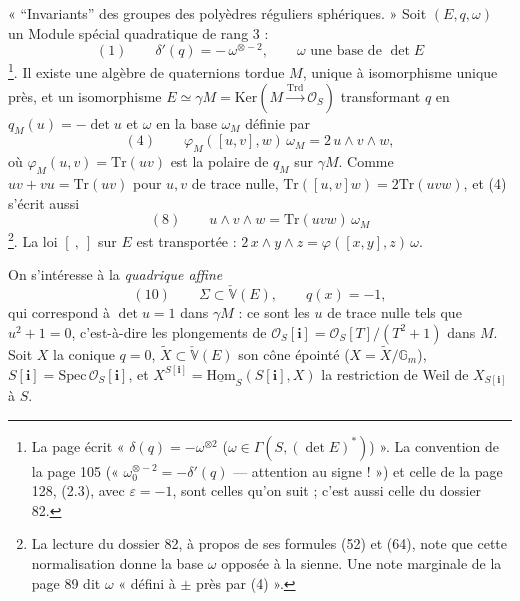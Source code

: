 \documentclass[11pt,a4paper]{article}
\begin{document}
« “Invariants” des groupes des polyèdres réguliers sphériques. » Soit $(E, q,
\omega)$ un Module spécial quadratique de rang $3$ :
\[
  (1) \qquad \delta'(q) = -\,\omega^{\otimes -2}, \qquad \omega \text{ une base de }
  \det E
\]
\footnote{La page écrit « $\delta(q) = -\omega^{\otimes 2}$ ($\omega \in \Gamma(S, (\det
E)^{*})$) ». La convention de la page 105 (« $\omega_0^{\otimes -2} =
-\delta'(q)$ — attention au signe ! ») et celle de la page 128, (2.3), avec $\varepsilon
= -1$, sont celles qu'on suit ; c'est aussi celle du dossier 82.}. Il existe une
algèbre de quaternions tordue $M$, unique à isomorphisme unique près, et un
isomorphisme $E \simeq \gamma M = \mathrm{Ker}(M \xrightarrow{\mathrm{Trd}} \mathcal{O}_S)$
transformant $q$ en $q_M(u) = -\det u$ et $\omega$ en la base $\omega_M$ définie par
\[
  (4) \qquad \varphi_M([u, v], w)\, \omega_M = 2\, u \wedge v \wedge w ,
\]
où $\varphi_M(u, v) = \mathrm{Tr}(uv)$ est la polaire de $q_M$ sur $\gamma M$. Comme
$uv + vu = \mathrm{Tr}(uv)$ pour $u, v$ de trace nulle, $\mathrm{Tr}([u, v]w) =
2\mathrm{Tr}(uvw)$, et (4) s'écrit aussi
\[
  (8) \qquad u \wedge v \wedge w = \mathrm{Tr}(uvw)\, \omega_M
\]
\footnote{La lecture du dossier 82, à propos de ses formules (52) et (64), note
que cette normalisation donne la base $\omega$ opposée à la sienne. Une note
marginale de la page 89 dit $\omega$ « défini à $\pm$ près par (4) ».}. La loi
$[\ ,\ ]$ sur $E$ est transportée : $2\, x \wedge y \wedge z = \varphi([x, y], z)\,
\omega$.

On s'intéresse à la \emph{quadrique affine}
\[
  (10) \qquad \Sigma \subset \check{\mathbb{V}}(E), \qquad q(x) = -1,
\]
qui correspond à $\det u = 1$ dans $\gamma M$ : ce sont les $u$ de trace nulle tels que
$u^2 + 1 = 0$, c'est-à-dire les plongements de $\mathcal{O}_S[\mathbf{i}] =
\mathcal{O}_S[T]/(T^2 + 1)$ dans $M$. Soit $X$ la conique $q = 0$, $\tilde{X} \subset
\check{\mathbb{V}}(E)$ son cône épointé ($X = \tilde{X}/\mathbb{G}_m$), $S[\mathbf{i}] =
\mathrm{Spec}\,\mathcal{O}_S[\mathbf{i}]$, et $X^{S[\mathbf{i}]} =
\underline{\mathrm{Hom}}_S(S[\mathbf{i}], X)$ la restriction de Weil de
$X_{S[\mathbf{i}]}$ à $S$.
\end{document}
